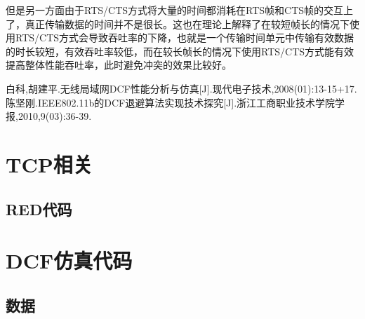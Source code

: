 \documentclass{article}
\begin{document}
但是另一方面由于RTS/CTS方式将大量的时间都消耗在RTS帧和CTS帧的交互上了，真正传输数据的时间并不是很长。这也在理论上解释了在较短帧长的情况下使用RTS/CTS方式会导致吞吐率的下降，也就是一个传输时间单元中传输有效数据的时长较短，有效吞吐率较低，而在较长帧长的情况下使用RTS/CTS方式能有效提高整体性能吞吐率，此时避免冲突的效果比较好。

\begin{thebibliography}{99}
	 白科,胡建平.无线局域网DCF性能分析与仿真[J].现代电子技术,2008(01):13-15+17.
	 陈坚刚.IEEE802.11b的DCF退避算法实现技术探究[J].浙江工商职业技术学院学报,2010,9(03):36-39.
\end{thebibliography}

\appendix
\section{TCP相关}

\subsection {\bf RED代码}


\section{DCF仿真代码}
\subsection{数据}
\end{document}
